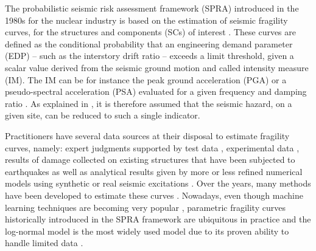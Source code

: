 The probabilistic seismic risk assessment framework (SPRA) introduced in the 1980s for the nuclear industry is based on the estimation of seismic fragility curves, for the structures and components (SCs) of interest \citep{kennedy_probabilistic_1980,kennedy_seismic_1984,park_survey_1998,kennedy_risk_1999,cornell_hazard_2004}. These curves are defined as the conditional probability that an engineering demand parameter (EDP) -- such as the interstory drift ratio -- exceeds a limit threshold, given a scalar value derived from the seismic ground motion and called intensity measure (IM). The IM can be for instance the peak ground acceleration (PGA) or a pseudo-spectral acceleration (PSA) evaluated for a given frequency and damping ratio \citep{ciano_role_2020,sainct_efficient_2020,ciano_novel_2022}. As explained in \cite{cornell_hazard_2004}, it is therefore assumed that the seismic hazard, on a given site, can be reduced to such a single indicator.


Practitioners have several data sources at their disposal to estimate fragility curves, namely: expert judgments supported by test data \citep{kennedy_probabilistic_1980,kennedy_seismic_1984,park_survey_1998,zentner_fragility_2017}, experimental data \citep{park_survey_1998,gardoni_probabilistic_2002,choe_closed-form_2007}, results of damage collected on existing structures that have been subjected to earthquakes \citep{shinozuka_statistical_2000,lallemant_statistical_2015,straub_improved_2008} as well as analytical results given by more or less refined numerical models using synthetic or real seismic excitations \citep{zentner_numerical_2010,wang_influence_2020,mandal_seismic_2016,wang_bayesian_2018,wang_seismic_2018,zhao_seismic_2020}. Over the years, many methods have been developed to estimate these curves \citep{shinozuka_statistical_2000,lallemant_statistical_2015,zentner_fragility_2017}. Nowadays, even though machine learning techniques are becoming very popular  \citep{park_rapid_2014,seo_use_2013,gidaris_kriging_2015,wang_seismic_2018,sainct_efficient_2020,gauchy_estimation_2022}, parametric fragility curves historically introduced in the SPRA framework are ubiquitous in practice and the log-normal model is the most widely used model due to its proven ability to handle limited data \citep{shinozuka_statistical_2000,lallemant_statistical_2015,straub_improved_2008,zentner_numerical_2010,wang_influence_2020,mandal_seismic_2016,hariri-ardebili_probabilistic_2016,wang_bayesian_2018,wang_seismic_2018,zhao_seismic_2020,ellingwood_earthquake_2001,kim_development_2004,mai_seismic_2017,trevlopoulos_parametric_2019,katayama_bayesian-estimation-based_2021}.

